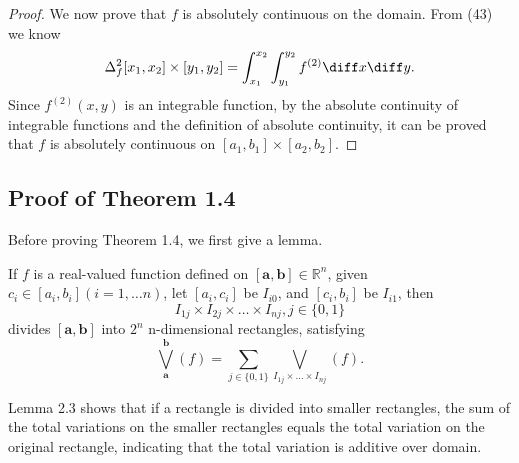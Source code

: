 \documentclass{ijclclp}
\begin{document}
\begin{proof}
    We now prove that \(f\) is absolutely continuous on the domain. From (43) we know 
    \[\Delta_f^2[x_1,x_2]\times[y_1,y_2]=\int_{x_1}^{x_2}\int_{y_1}^{y_2}f^{(2)}\diff x\diff y.\]
    Since \(f^{(2)}(x,y)\) is an integrable function, by the absolute continuity of integrable functions and the definition of absolute continuity, it can be proved that \(f\) is absolutely continuous on \([a_1,b_1]\times[a_2,b_2]\).
\end{proof}

\subsection{Proof of Theorem 1.4}
Before proving Theorem 1.4, we first give a lemma.
\begin{lemma} 
    If \(f\) is a real-valued function defined on \([\boldsymbol{a},\boldsymbol{b}]\in\mathbb{R}^n\), given \(c_i\in[a_i,b_i](i=1,\dots n)\), let \([a_i,c_i]\) be \(I_{i0}\), and \([c_i,b_i]\) be \(I_{i1}\), then
    \[I_{1j}\times I_{2j}\times\dots\times I_{nj},j\in\{0,1\}\]
    divides \([\boldsymbol{a},\boldsymbol{b}]\) into \(2^n\) n-dimensional rectangles, satisfying
    \begin{equation}
        \bigvee_{\boldsymbol{a}}^{\boldsymbol{b}}(f)=\sum_{j\in\{0,1\}}\bigvee_{I_{1j}\times\dots\times I_{nj}}(f).
    \end{equation}
\end{lemma}
\begin{remark}
    Lemma 2.3 shows that if a rectangle is divided into smaller rectangles, the sum of the total variations on the smaller rectangles equals the total variation on the original rectangle, indicating that the total variation is additive over domain.  
\end{remark}
\end{document}
